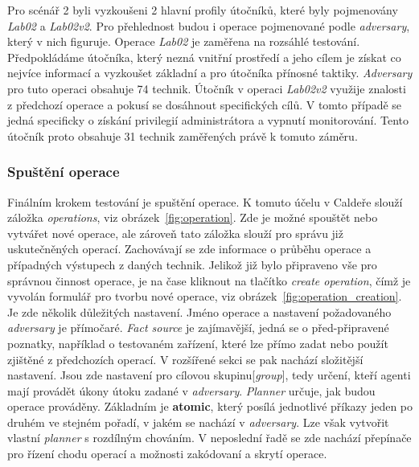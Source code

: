 
Pro scénář 2 byli vyzkoušeni 2 hlavní profily útočníků, které byly pojmenovány \textit{Lab02} a \textit{Lab02v2}.
Pro přehlednost budou i operace pojmenované podle \textit{adversary}, který v nich figuruje.
Operace \textit{Lab02} je zaměřena na rozsáhlé testování.
Předpokládáme útočníka, který nezná vnitřní prostředí a jeho cílem je získat co nejvíce informací a vyzkoušet základní a pro útočníka přínosné taktiky.
\textit{Adversary} pro tuto operaci obsahuje 74 technik.
Útočník v operaci \textit{Lab02v2} využije znalosti z předchozí operace a pokusí se dosáhnout specifických cílů.
V tomto případě se jedná specificky o získání privilegií administrátora a vypnutí monitorování.
Tento útočník proto obsahuje 31 technik zaměřených právě k tomuto záměru.


\subsubsection{Spuštění operace}
Finálním krokem testování je spuštění operace.
K tomuto účelu v Caldeře slouží záložka \textit{operations}, viz obrázek~\ref{fig:operation}.
Zde je možné spouštět nebo vytvářet nové operace, ale zároveň tato záložka slouží pro správu již uskutečněných operací.
Zachovávají se zde informace o průběhu operace a případných výstupech z daných technik.
Jelikož již bylo připraveno vše pro správnou činnost operace, je na čase kliknout na tlačítko \textit{create operation}, čímž je vyvolán formulář pro tvorbu nové operace, viz obrázek~\ref{fig:operation_creation}.
Je zde několik důležitých nastavení.
Jméno operace a nastavení požadovaného \textit{adversary} je přímočaré.
\textit{Fact source} je zajímavější, jedná se o před-připravené poznatky, například o testovaném zařízení, které lze přímo zadat nebo použít zjištěné z předchozích operací.
V rozšířené sekci se pak nachází složitější nastavení.
Jsou zde nastavení pro cílovou skupinu[\textit{group}], tedy určení, kteří agenti mají provádět úkony útoku zadané v \textit{adversary}.
\textit{Planner} určuje, jak budou operace prováděny.
Základním je \textbf{atomic}, který posílá jednotlivé příkazy jeden po druhém ve stejném pořadí, v jakém se nachází v \textit{adversary}.
Lze však vytvořit vlastní \textit{planner} s rozdílným chováním\cite{mitre_caldera_docs}.
V neposlední řadě se zde nachází přepínače pro řízení chodu operací a možnosti zakódovaní a skrytí operace.

